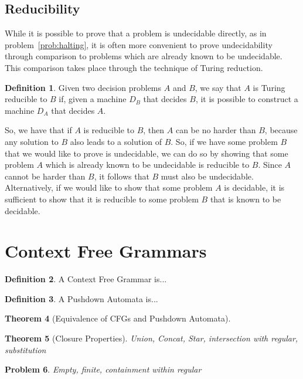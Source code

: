 \documentclass[psamsfonts]{amsart}
\newtheorem{thm}{Theorem}[section]
\newtheorem{prob}[thm]{Problem}
\theoremstyle{definition}
\newtheorem{defn}[thm]{Definition}
\theoremstyle{remark}
\numberwithin{equation}{section}
\begin{document}
\subsection{Reducibility}
While it is possible to prove that a problem is undecidable directly, as in
problem~\ref{prob:halting}, it is often more convenient to prove undecidability
through comparison to problems which are already known to be undecidable. This
comparison takes place through the technique of Turing reduction.
\begin{defn}
  Given two decision problems $A$ and $B$, we say that $A$ is Turing reducible
  to $B$ if, given a machine $D_B$ that decides $B$, it is possible to construct
  a machine $D_A$ that decides $A$.
\end{defn}
So, we have that if $A$ is reducible to $B$, then $A$ can be no harder than $B$,
because any solution to $B$ also leads to a solution of $B$. So, if we have some
problem $B$ that we would like to prove is undecidable, we can do so by showing
that some problem $A$ which is already known to be undecidable is reducible to
$B$. Since $A$ cannot be harder than $B$, it follows that $B$ must also be
undecidable. Alternatively, if we would like to show that some problem $A$ is
decidable, it is sufficient to show that it is reducible to some problem $B$
that is known to be decidable.
\cite{sipser13:_introd_theor_comput}
\cite{post44:_recur}

\cite{kleene80_introd}

\section{Context Free Grammars}

\begin{defn}
 A Context Free Grammar is...
\end{defn}

\begin{defn}
  A Pushdown Automata is...
\end{defn}

\begin{thm}[Equivalence of CFGs and Pushdown Automata]
  \cite{hopcroft07:_introd_autom_theor_languag_comput}
\end{thm}
\begin{thm}[Closure Properties]
  \cite{sipser13:_introd_theor_comput}
  Union, Concat, Star, intersection with regular, substitution
\end{thm}
\begin{prob}
Empty, finite, containment within regular
\end{prob}
\end{document}
